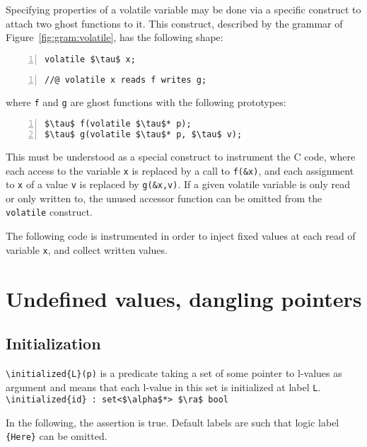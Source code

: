 Specifying properties of a volatile variable may be done via a
specific construct to attach two ghost functions to it. This
construct, described by the grammar of Figure~\ref{fig:gram:volatile}, has
the following shape:
\begin{lstlisting}[style=c-basic,firstnumber=1,name=volatile,numbers=left]
volatile $\tau$ x;
\end{lstlisting}
\begin{lstlisting}[style=c-basic,name=volatile,numbers=left]
//@ volatile x reads f writes g;
\end{lstlisting}
where \lstinline|f| and \lstinline|g| are ghost functions with the following prototypes:
\begin{lstlisting}[style=c-basic,name=volatile,numbers=left]
$\tau$ f(volatile $\tau$* p);
$\tau$ g(volatile $\tau$* p, $\tau$ v);
\end{lstlisting}
This must be understood as a special construct to instrument the C
code, where each access to the variable \lstinline|x| is replaced by a call
to \lstinline|f(&x)|, and each assignment to \lstinline|x| of a value
\lstinline|v|
is replaced by \lstinline|g(&x,v)|. If a given volatile variable is only read 
or only written to, the unused accessor function can be omitted from the 
\lstinline|volatile| construct.

\begin{example}
  The following code is instrumented in order to inject fixed values
  at each read of variable \lstinline|x|, and collect written values.
\end{example}


\section{Undefined values, dangling pointers}

\subsection{Initialization}
\label{sec:initialized}
\lstinline|\initialized{L}(p)| is a predicate taking a set of some pointer to l-values as
argument and means that each l-value in this set is initialized at label \lstinline|L|.
\\ \makebox[5mm]{} \lstinline|\initialized{id} : set<$\alpha$*> $\ra$ bool|

\begin{example}
  In the following, the assertion is true.
  Default labels are 
  such that logic label \lstinline|{Here}| can be omitted.
\end{example}

